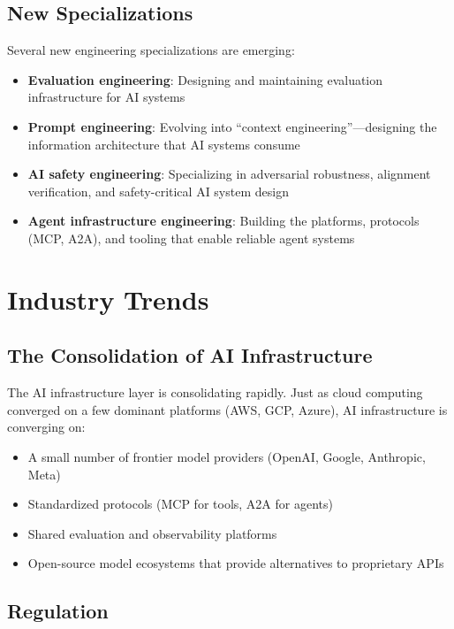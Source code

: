 \subsection{New Specializations}

Several new engineering specializations are emerging:

\begin{itemize}[leftmargin=*]
    \item \textbf{Evaluation engineering}: Designing and maintaining evaluation infrastructure for AI systems
    \item \textbf{Prompt engineering}: Evolving into ``context engineering''---designing the information architecture that AI systems consume
    \item \textbf{AI safety engineering}: Specializing in adversarial robustness, alignment verification, and safety-critical AI system design
    \item \textbf{Agent infrastructure engineering}: Building the platforms, protocols (MCP, A2A), and tooling that enable reliable agent systems
\end{itemize}


\section{Industry Trends}

\subsection{The Consolidation of AI Infrastructure}

The AI infrastructure layer is consolidating rapidly. Just as cloud computing converged on a few dominant platforms (AWS, GCP, Azure), AI infrastructure is converging on:

\begin{itemize}[leftmargin=*]
    \item A small number of frontier model providers (OpenAI, Google, Anthropic, Meta)
    \item Standardized protocols (MCP for tools, A2A for agents)
    \item Shared evaluation and observability platforms
    \item Open-source model ecosystems that provide alternatives to proprietary APIs
\end{itemize}

\subsection{Regulation}

